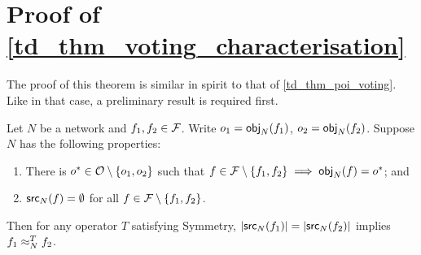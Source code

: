 \section{Proof of \cref{td_thm_voting_characterisation}}

The proof of this theorem is similar in spirit to that of
\cref{td_thm_poi_voting}. Like in that case, a preliminary result is required
first.

\begin{lemma}
\label{td_lemma_voting_characterisation_lemma}
Let $N$ be a network and $f_1, f_2 \in \mathcal{F}$. Write $o_1 = \mathsf{obj}_{N}(f_1)$, $o_2
= \mathsf{obj}_N(f_2)$. Suppose $N$ has the following properties:

\begin{enumerate}
    \item There is $o^* \in \mathcal{O} \setminus \{o_1, o_2\}$ such that $f \in \mathcal{F}
          \setminus \{f_1, f_2\} \implies \mathsf{obj}_{N}(f) = o^*$; and

    \item $\mathsf{src}_{N}(f) = \emptyset$ for all $f \in \mathcal{F} \setminus \{f_1, f_2\}$.

\end{enumerate}

Then for any operator $T$ satisfying Symmetry, $|\mathsf{src}_{N}(f_1)| =
|\mathsf{src}_{N}(f_2)|$ implies $f_1 \approx_{N}^T f_2$.
\end{lemma}

